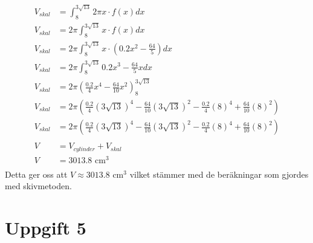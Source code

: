\documentclass[12pt]{article}
\begin{document}
\begin{align*}
    V_{skal}&=\int_{8}^{3\sqrt{13}}2\pi x\cdot f(x) dx\\
    V_{skal}&=2\pi\int_{8}^{3\sqrt{13}}x\cdot f(x) dx\\
    V_{skal}&=2\pi\int_{8}^{3\sqrt{13}}x\cdot (0.2x^2-\frac{64}{5}) dx\\
    V_{skal}&=2\pi\int_{8}^{3\sqrt{13}}0.2x^3-\frac{64}{5}x dx\\
    V_{skal}&=2\pi{\left(\frac{0.2}{4}x^4-\frac{64}{10}x^2\right)}_{8}^{3\sqrt{13}}\\
    V_{skal}&=2\pi\left(\frac{0.2}{4}{(3\sqrt{13})}^4-\frac{64}{10}{(3\sqrt{13})}^2-\frac{0.2}{4}{(8)}^4+\frac{64}{10}{(8)}^2\right)\\
    V_{skal}&=2\pi\left(\frac{0.2}{4}{(3\sqrt{13})}^4-\frac{64}{10}{(3\sqrt{13})}^2-\frac{0.2}{4}{(8)}^4+\frac{64}{10}{(8)}^2\right)\\
    \\
    V&=V_{cylinder}+V_{skal}\\
    V&=3013.8 \text { cm}^3\\
\end{align*}
Detta ger oss att $V\approx 3013.8 \text { cm}^3$ vilket stämmer med de beräkningar som gjordes med skivmetoden.
\newpage
\section*{Uppgift 5}
\end{document}
